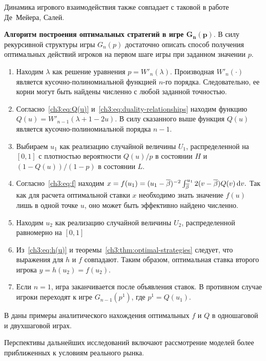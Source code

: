 Динамика игрового взаимодействия также совпадает с таковой в работе Де~Мейера, Салей.

\noindent
\textbf{Алгоритм построения оптимальных стратегий в игре $\mathbf{G_n(p)}$}.
В силу рекурсивной структуры игры $G_n(p)$ достаточно описать способ получения оптимальных действий игроков на первом шаге игры при заданном значении $p$.
\begin{enumerate}
\item
  Находим $\lambda$ как решение уравнения 
  $
    p = W'_n(\lambda).
  $
  Производная $W'_n(\cdot)$ является кусочно-полиномиальной функцией $n$-го порядка.
  Следовательно, ее корни могут быть найдены численно с любой заданной точностью.
\item
  Согласно~\eqref{ch3:eq:Q(u)} и~\eqref{ch3:eq:duality-relationships} находим функцию 
  $
    Q(u) = W'_{n-1}(\lambda + 1 - 2u).
  $
  В силу сказанного выше функция $Q(u)$ является кусочно-полиномиальной порядка $n-1$.
\item
  Выбираем $u_1$ как реализацию случайной величины $U_1$, распределенной на $[0, 1]$ с плотностью вероятности $Q(u)/p$ в состоянии $H$ и $\left(1 - Q(u)\right)/(1-p)$ в состоянии $L$.
\item
  Согласно~\eqref{ch3:eq:f} находим 
  $
    x = f(u_1) = (u_1 - {{\overline{\beta}}})^{-2} \int_{{{\overline{\beta}}}}^{u_1} 2 (v - {{\overline{\beta}}}) Q(v) \mathop{}\!\mathrm{d} v.
  $
  Так как для расчета оптимальной ставки $x$ необходимо знать значение $f(u)$ лишь в одной точке $u$, оно может быть эффективно найдено численно.
\item
  Находим $u_2$ как реализацию случайной величины $U_2$, распределенной равномерно на $[0, 1]$
\item
  Из~\eqref{ch3:eq:h(u)} и теоремы~\ref{ch3:thm:optimal-strategies} следует, что выражения для $h$ и $f$ совпадают.
  Таким образом, оптимальная ставка второго игрока $y = h(u_2) = f(u_2)$.
\item
  Если $n = 1$, игра заканчивается после объявления ставок. В противном случае игроки переходят к игре $G_{n-1}(p^1)$, где $p^1 = Q(u_1)$.
\end{enumerate}

В  даны примеры аналитического нахождения оптимальных $f$ и $Q$ в одношаговой и двухшаговой играх.

Перспективы дальнейших исследований включают рассмотрение моделей более приближенных к условиям реального рынка.

% 

